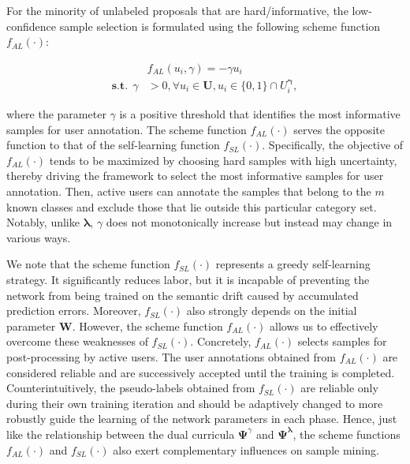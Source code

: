 \documentclass[journal]{IEEEtran}
\begin{document}
	
For the minority of unlabeled proposals that are hard/informative, the low-confidence sample selection {is formulated using the following} scheme function $f_{AL}(\cdot)$:

\begin{small}
		\begin{equation}
		\label{eq:f2}
		\begin{aligned}
		&f_{AL}(u_i,\gamma) = -\gamma u_i \ \\ \mathbf{s.t.} \ \ \gamma &> 0, \forall u_i\in \mathbf{U}, u_i \in \{0,1\}\cap U^{\bm \gamma}_i, 
		\end{aligned}
		\end{equation}
\end{small}where the parameter $\gamma$ is a positive threshold that identifies the most informative samples for user annotation. The scheme function $f_{AL}(\cdot)$ {serves the opposite function to that of} the self-learning function $f_{SL}(\cdot)$. Specifically, {the objective of} $f_{AL}(\cdot)$ tends to {be maximized} by choosing hard samples with high uncertainty, {thereby driving} the framework to select the most informative samples for user annotation. {Then, active users} can annotate the samples that belong to the $m$ {known} classes and exclude those that lie outside this particular category set. {Notably, unlike} ${\bm \lambda}$, $\gamma$ {does not monotonically increase but instead may} change in various ways.


{We note that} the scheme function $f_{SL}(\cdot)$ represents a greedy self-learning strategy. It significantly {reduces} labor, but it is incapable of preventing the network from {being trained} on the semantic drift caused by accumulated prediction errors. Moreover, $f_{SL}(\cdot)$ also {strongly depends} on the initial parameter $\mathbf{W}$. {However}, the scheme function $f_{AL}(\cdot)$ {allows us to effectively overcome these weaknesses} of $f_{SL}(\cdot)$. Concretely, $f_{AL}(\cdot)$ selects samples for post-processing by active users. The user annotations obtained {from} $f_{AL}(\cdot)$ are considered reliable and {are} successively accepted until the training is completed. Counterintuitively, the pseudo-labels obtained {from} $f_{SL}(\cdot)$ are reliable only during their own training iteration and should be adaptively changed to more robustly guide the learning of the network parameters in each phase. Hence, just like the relationship between the dual curricula $\mathbf{\Psi}^{\gamma}$ and $\mathbf{\Psi}^{\bm \lambda}$, the scheme functions $f_{AL}(\cdot)$ and $f_{SL}(\cdot)$ also exert complementary influences on sample mining.
\end{document}

